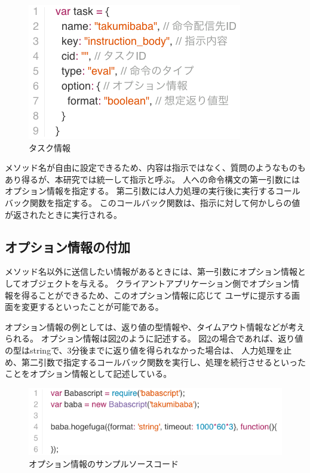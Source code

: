 \begin{figure}[htbp]
  \begin{center}
  \includegraphics[width=.6\linewidth,bb=0 0 354 225]{images/task_format.js.png}
  \end{center}
  \caption{タスク情報}
  \label{fig:task_format}
\end{figure}

メソッド名が自由に設定できるため、内容は指示ではなく、質問のようなものもあり得るが、本研究では統一して指示と呼ぶ。
人への命令構文の第一引数にはオプション情報を指定する。
第二引数には人力処理の実行後に実行するコールバック関数を指定する。
このコールバック関数は、指示に対して何かしらの値が返されたときに実行される。

\subsection{オプション情報の付加}\label{ux30aaux30d7ux30b7ux30e7ux30f3ux60c5ux5831ux306eux4ed8ux52a0}

メソッド名以外に送信したい情報があるときには、第一引数にオプション情報としてオブジェクトを与える。
クライアントアプリケーション側でオプション情報を得ることができるため、このオプション情報に応じて
ユーザに提示する画面を変更するといったことが可能である。

オプション情報の例としては、返り値の型情報や、タイムアウト情報などが考えられる。
オプション情報は図\ref{fig:babascript_option}のように記述する。
図\ref{fig:babascript_option}の場合であれば、返り値の型はstringで、3分後までに返り値を得られなかった場合は、
人力処理を止め、第二引数で指定するコールバック関数を実行し、処理を続行させるといったことをオプション情報として記述している。

\begin{figure}[htbp]
  \begin{center}
  \includegraphics[width=.8\linewidth,bb=0 0 563 149]{images/babascript_option_sample.js.png}
  \end{center}
  \caption{オプション情報のサンプルソースコード}
  \label{fig:babascript_option}
\end{figure}

